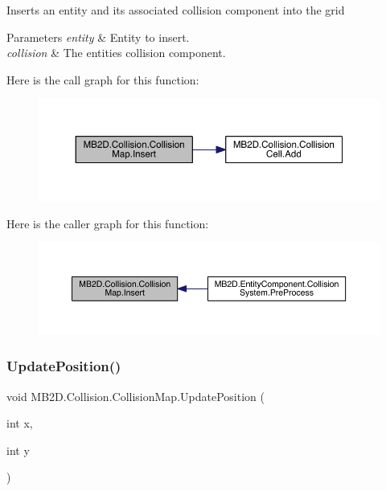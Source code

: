 Inserts an entity and its associated collision component into the grid 


\begin{DoxyParams}{Parameters}
{\em entity} & Entity to insert.\\
\hline
{\em collision} & The entities collision component.\\
\hline
\end{DoxyParams}
Here is the call graph for this function\+:
\nopagebreak
\begin{figure}[H]
\begin{center}
\leavevmode
\includegraphics[width=350pt]{class_m_b2_d_1_1_collision_1_1_collision_map_a7d53571c049d50d62e6132413fe712e3_cgraph}
\end{center}
\end{figure}
Here is the caller graph for this function\+:
\nopagebreak
\begin{figure}[H]
\begin{center}
\leavevmode
\includegraphics[width=350pt]{class_m_b2_d_1_1_collision_1_1_collision_map_a7d53571c049d50d62e6132413fe712e3_icgraph}
\end{center}
\end{figure}
\hypertarget{class_m_b2_d_1_1_collision_1_1_collision_map_a8f34c934947ce25d7de681fc07f14e09}{}\label{class_m_b2_d_1_1_collision_1_1_collision_map_a8f34c934947ce25d7de681fc07f14e09} 
\subsubsection{\texorpdfstring{Update\+Position()}{UpdatePosition()}}
{\footnotesize\ttfamily void M\+B2\+D.\+Collision.\+Collision\+Map.\+Update\+Position (\begin{DoxyParamCaption}\item[{int}]{x,  }\item[{int}]{y }\end{DoxyParamCaption})\hspace{0.3cm}{\ttfamily [inline]}}




